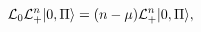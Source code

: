 \begin{equation}
	{\cal L}_{0} {\cal L}_{+}^{n} |0,\Pi \rangle =
 	(n-\mu) {\cal L}_{+}^{n} |0,\Pi \rangle ,
\end{equation}

